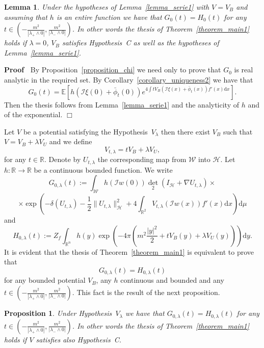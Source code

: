 \documentclass[a4paper,10pt]{article}
\newcommand{\assign}{:=}
\newcommand{\mathd}{\mathrm{d}}
\newenvironment{proof}{\noindent\textbf{Proof\ }}{\hspace*{\fill}$\Box$\medskip}
\newtheorem{lemma}[theorem]{Lemma}
\newtheorem{proposition}[theorem]{Proposition}
{\theorembodyfont{\rmfamily}\newtheorem{remark}[theorem]{Remark}}
\begin{document}
\begin{lemma}
  \label{lemma_serie2}Under the hypotheses of Lemma~\ref{lemma_serie1} with $V
  = V_B$ and assuming that $h$ is an entire function we have that $G_0 (t) =
  H_0 (t)$ for any $t \in \left( - \frac{m^2}{| \lambda_+ \wedge 0 |},
  \frac{m^2}{| \lambda_- \wedge 0 |} \right)$. In other words the thesis of
  Theorem~\ref{theorem_main1} holds if $\lambda = 0$, $V_B$ satisfies
  Hypothesis~C as well as the hypotheses of Lemma~\ref{lemma_serie1}.
\end{lemma}

\begin{proof}
  By Proposition~\ref{proposition_chi} we need only to prove that $G_0$ is
  real analytic in the required set. By Corollary~\ref{corollary_uniqueness2}
  we have that
  \[ G_0 (t) =\mathbb{E} \left[ h (\mathcal{I} \xi (0) + \bar{\phi}_t (0))
     e^{4 \int t V_B (\mathcal{I} \xi (x) + \bar{\phi}_t (x)) f' (x) \mathd x}
     \right] . \]
  Then the thesis follows from Lemma~\ref{lemma_serie1} and the analyticity of
  $h$ and of the exponential.
\end{proof}

Let $V$ be a potential satisfying the Hypothesis~$V_{\lambda}$ then there
exist $V_B$ such that $V = V_B + \lambda V_U$ and we define
\[ V_{t, \lambda} = t V_B + \lambda V_U, \]
for any $t \in \mathbb{R}$. Denote by $U_{t, \lambda}$ the corresponding map
from $\mathcal{W}$ into $\mathcal{H}$. Let $h : \mathbb{R} \rightarrow
\mathbb{R}$ be a continuous bounded function. We write
\[ G_{0, \lambda} (t) \assign \int_{\mathcal{W}} h (\mathcal{I} w (0)) \det_2
   (I_{\mathcal{H}} + \nabla U_{t, \lambda}) \times \]
\[ \times \exp \left( - \delta (U_{t, \lambda}) - \frac{1}{2} \|U_{t, \lambda}
   \|^2_{\mathcal{H}} + 4 \int_{\mathbb{R}^2} V_{t, \lambda} (\mathcal{I} w
   (x)) f' (x) \mathd x \right) \mathd \mu \]
and
\[ H_{0, \lambda} (t) \assign Z_f \int_{\mathbb{R}^n} h (y) \exp \left( - 4
   \pi \left( m^2 \frac{| y |^2}{2} + t V_B (y) + \lambda V_U (y) \right)
   \right) \mathd y. \]
It is evident that the thesis of Theorem~\ref{theorem_main1} is equivalent to
prove that
\[ G_{0, \lambda} (t) = H_{0, \lambda} (t) \]
for any bounded potential $V_B$, any $h$ continuous and bounded and any $t \in
\left( - \frac{m^2}{| \lambda_+ \wedge 0 |}, \frac{m^2}{| \lambda_- \wedge 0
|} \right)$. This fact is the result of the next proposition.

\begin{proposition}
  \label{proposition_serie3}Under Hypothesis~$V_{\lambda}$ we have that $G_{0,
  \lambda} (t) = H_{0, \lambda} (t)$ for any $t \in \left( - \frac{m^2}{|
  \lambda_+ \wedge 0 |}, \frac{m^2}{| \lambda_- \wedge 0 |} \right)$. In other
  words the thesis of Theorem~\ref{theorem_main1} holds if $V$ satisfies also
  Hypothesis~C.
\end{proposition}
\end{document}
